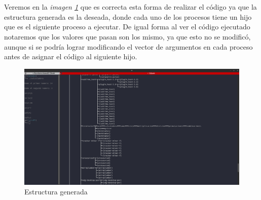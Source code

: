 \documentclass[10pt]{article}
\begin{document}
	\\\\
	Veremos en la \emph{imagen \ref{fig:pruebae1}} que es correcta esta forma de realizar el código ya que la estructura generada es la deseada, donde cada uno de los procesos tiene un hijo que es el siguiente proceso a ejecutar. De igual forma al ver el código ejecutado notaremos que los valores que pasan son los mismo, ya que esto no se modificó, aunque si se podría lograr modificando el vector de argumentos en cada proceso antes de asignar el código al siguiente hijo. 
	\begin{figure}[h!]
		\centering
		\includegraphics[width=\linewidth]{pruebaE1}
		\caption{Estructura generada}
		\label{fig:pruebae1}
	\end{figure}
	\newpage
	
\end{document}
